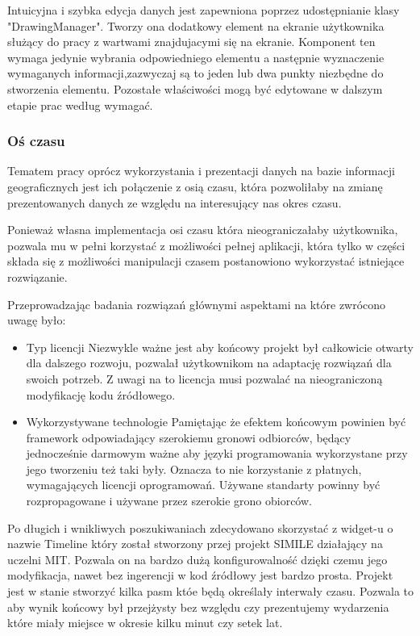 Intuicyjna i szybka edycja danych jest zapewniona poprzez udostępnianie klasy "DrawingManager". Tworzy ona dodatkowy element na ekranie użytkownika służący do pracy z wartwami znajdujacymi się na ekranie. Komponent ten wymaga jedynie wybrania odpowiedniego elementu a następnie wyznaczenie wymaganych informacji,zazwyczaj są to jeden lub dwa punkty niezbędne do stworzenia elementu. Pozostałe właściwości mogą być edytowane w dalszym etapie prac według wymagać.


\subsubsection{Oś czasu}
\label{subsubsec:os}

Tematem pracy oprócz wykorzystania i prezentacji danych na bazie informacji geograficznych jest ich połączenie z osią czasu, która pozwoliłaby na zmianę prezentowanych danych ze względu na interesujący nas okres czasu.

Ponieważ własna implementacja osi czasu która nieograniczałaby użytkownika, pozwala mu w pełni korzystać z możliwości pełnej aplikacji, która tylko w części składa się z możliwości manipulacji czasem postanowiono wykorzystać istniejące rozwiązanie.

Przeprowadzając badania rozwiązań głównymi aspektami na które zwrócono uwagę było:


\begin{itemize}

\item

Typ licencji
Niezwykle ważne jest aby końcowy projekt był całkowicie otwarty dla dalszego rozwoju, pozwalał użytkownikom na adaptację rozwiązań dla swoich potrzeb. Z uwagi na to licencja musi pozwalać na nieograniczoną modyfikację kodu źródłowego.

\item

Wykorzystywane technologie
Pamiętając że efektem końcowym powinien być framework odpowiadający szerokiemu gronowi odbiorców, będący jednocześnie darmowym ważne aby języki programowania wykorzystane przy jego tworzeniu też taki były. Oznacza to nie korzystanie z płatnych, wymagających licencji oprogramowań. Używane standarty powinny być rozpropagowane i używane przez szerokie grono obiorców.

\end{itemize}

Po długich i wnikliwych poszukiwaniach zdecydowano skorzystać z widget-u o nazwie Timeline który został stworzony przej projekt SIMILE działający na uczelni MIT. Pozwala on na bardzo dużą konfigurowalność dzięki czemu jego modyfikacja, nawet bez ingerencji w kod źródłowy jest bardzo prosta.
Projekt jest w stanie stworzyć kilka pasm któe będą określały interwały czasu. Pozwala to aby wynik końcowy był przejżysty bez względu czy prezentujemy wydarzenia które miały miejsce w okresie kilku minut czy setek lat.

